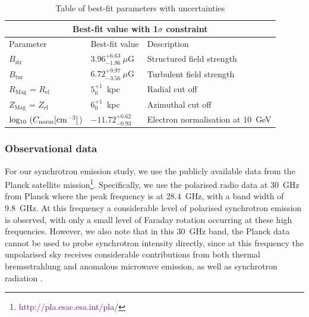 \documentclass[usenatbib]{mnras}
\begin{document}
\begin{table}
\centering
\caption{Table of best-fit parameters with uncertainties}
\begin{tabular}{ |p{}|p{4.5cm}|p{6.5cm}|  }
\hline
\multicolumn{3}{|c|}{Best-fit value with 1$\sigma$ constraint} \\
\hline
\rule{0pt}{3ex}
Parameter & Best-fit value &Description \\
\hline
\hline
\rule{0pt}{3ex}
$B_{\mathrm{str}} $& $3.96_{-1.96}^{+6.63} ~ \mu$G & Structured field strength \\
\hline
\rule{0pt}{3ex}
$B_{\mathrm{tur}} $& $ 6.72_{-3.56}^{+9.97} ~\mu$G & Turbulent field strength\\
\hline
\rule{0pt}{3ex}
$R_{\mathrm{Mag}}$ = $R_{\mathrm{el}}$ & $5_{0}^{+1}$~kpc & Radial cut off \\
\hline
\rule{0pt}{3ex}
$Z_{\mathrm{Mag}}$ = $Z_{\mathrm{el}}$ & $6_{0}^{+1}$~kpc & Azimuthal cut off\\
\hline
\rule{0pt}{3ex} 
${\rm{log_{10}}}~(C_{\rm norm} [{\rm cm}^{-3}]$) & ${-11.72}_{{-0.93}}^{{+0.62}}$ & Electron normalisation at 10~GeV\\
\hline
\end{tabular}
\label{Para_table}
\end{table}

\subsubsection{Observational data}
For our synchrotron emission study, we use the publicly available data from the Planck satellite mission\footnote{\textcolor{purple}{http://pla.esac.esa.int/pla/}}. Specifically, we use the polarised radio data at 30~GHz from Planck where the peak frequency is at 28.4~GHz, with a band width of 9.8~GHz. At this frequency a considerable level of polarised synchrotron emission is observed, with only a small level of Faraday rotation occurring at these high frequencies. However, we also note that in this 30~GHz band, the Planck data cannot be used to probe synchrotron intensity directly, since at this frequency the unpolarised sky receives considerable contributions from both thermal bremsstrahlung and anomalous microwave emission, as well as synchrotron radiation \citep{Planck_XIX, Planck_X, Planck_XXV, Planck_XLII}. 
\end{document}
